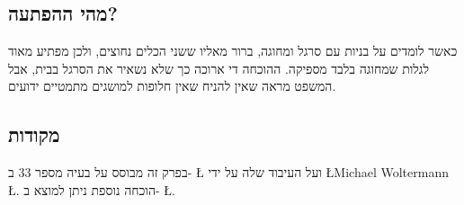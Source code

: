 

\subsection*{מהי ההפתעה?}

כאשר לומדים על בניות עם סרגל ומחוגה, ברור מאליו ששני הכלים נחוצים, ולכן מפתיע מאוד לגלות שמחוגה בלבד מספיקה. ההוכחה די ארוכה כך שלא נשאיר את הסרגל בבית, אבל המשפט מראה שאין להניח שאין חלופות למושגים מתמטיים ידועים.


\subsection*{מקודות}

בפרק זה מבוסס על בעיה מספר
$33$
ב-%
\L{\cite{dorrie1}}
ועל העיבוד שלה על ידי
\L{Michael Woltermann} \L{\cite{dorrie2}}.
הוכחה נוספת ניתן למוצא ב-%
\L{\cite{mm}}.
